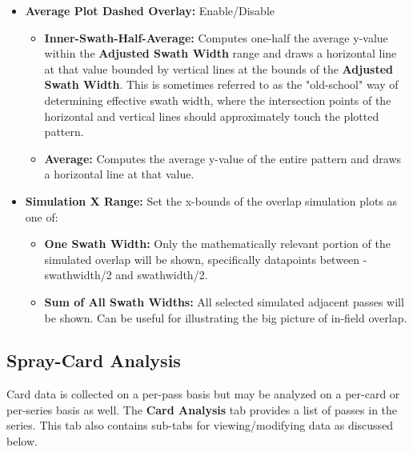 \documentclass[10pt,letterpaper,titlepage]{article}
\begin{document}
    \begin{itemize}
        \item \textbf{Average Plot Dashed Overlay:} Enable/Disable
        \begin{itemize}
            \item \textbf{Inner-Swath-Half-Average:} Computes one-half the average y-value within the \textbf{Adjusted Swath Width} range and draws a horizontal line at that value bounded by vertical lines at the bounds of the \textbf{Adjusted Swath Width}. This is sometimes referred to as the "old-school" way of determining effective swath width, where the intersection points of the horizontal and vertical lines should approximately touch the plotted pattern.
            \item \textbf{Average:} Computes the average y-value of the entire pattern and draws a horizontal line at that value.
        \end{itemize}
        \item \textbf{Simulation X Range:} Set the x-bounds of the overlap simulation plots as one of:
        \begin{itemize}
            \item \textbf{One Swath Width:} Only the mathematically relevant portion of the simulated overlap will be shown, specifically datapoints between -swathwidth/2 and swathwidth/2.
            \item \textbf{Sum of All Swath Widths:} All selected simulated adjacent passes will be shown. Can be useful for illustrating the big picture of in-field overlap.
        \end{itemize}
    \end{itemize}

    \newpage

    \subsection{Spray-Card Analysis}
    Card data is collected on a per-pass basis but may be analyzed on a per-card or per-series basis as well. The \textbf{Card Analysis} tab provides a list of passes in the series. This tab also contains sub-tabs for viewing/modifying data as discussed below.
\end{document}
